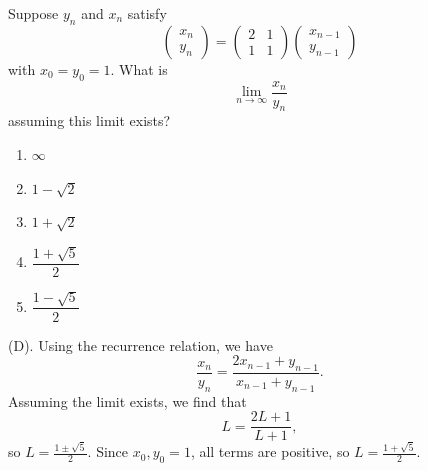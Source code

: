\begin{exercise}
Suppose $y_n$ and $x_n$ satisfy
\[
\begin{pmatrix}
x_n\\
y_n
\end{pmatrix}
=
\begin{pmatrix}
2 & 1\\
1 & 1
\end{pmatrix}
\begin{pmatrix}
x_{n-1}\\
y_{n-1}
\end{pmatrix}
\]
with $x_0=y_0=1$. What is
\[
\lim_{n\to\infty}\frac{x_n}{y_n}
\]
assuming this limit exists?
\begin{enumerate}[label=(\Alph*)]
    \item $\infty$
    \item $1-\sqrt{2}$
    \item $1+\sqrt{2}$
    \item $\dfrac{1+\sqrt{5}}{2}$
    \item $\dfrac{1-\sqrt{5}}{2}$
\end{enumerate}
\end{exercise}
\begin{solution}
(D). Using the recurrence relation, we have
\[
\frac{x_n}{y_n} = \frac{2x_{n - 1} + y_{n - 1}}{x_{n - 1} + y_{n - 1}}.
\]
Assuming the limit exists, we find that
\[
L = \frac{2L + 1}{L + 1},
\]
so $L = \frac{1 \pm \sqrt{5}}{2}$. Since $x_0, y_0 = 1$, all terms are positive, so 
$L = \frac{1 + \sqrt{5}}{2}$.
\end{solution}

